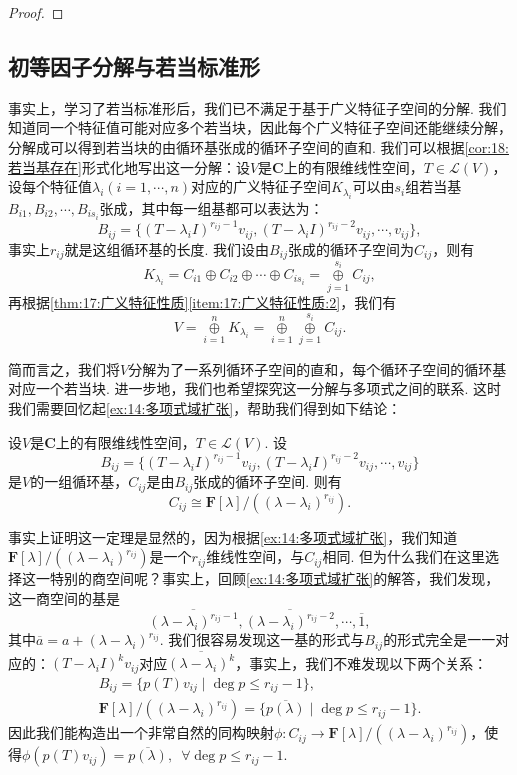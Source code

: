 \begin{proof}

\end{proof}

\subsection{初等因子分解与若当标准形}
事实上，学习了若当标准形后，我们已不满足于基于广义特征子空间的分解. 我们知道同一个特征值可能对应多个若当块，因此每个广义特征子空间还能继续分解，分解成可以得到若当块的由循环基张成的循环子空间的直和. 我们可以根据\autoref{cor:18:若当基存在}形式化地写出这一分解：设$V$是$\mathbf{C}$上的有限维线性空间，$T\in\mathcal{L}(V)$，设每个特征值$\lambda_i(i=1,\cdots,n)$对应的广义特征子空间$K_{\lambda_i}$可以由$s_i$组若当基$B_{i1},B_{i2},\cdots,B_{is_i}$张成，其中每一组基都可以表达为：
\[B_{ij}=\{(T-\lambda_iI)^{r_{ij}-1}v_{ij},(T-\lambda_iI)^{r_{ij}-2}v_{ij},\cdots,v_{ij}\},\]
事实上$r_{ij}$就是这组循环基的长度. 我们设由$B_{ij}$张成的循环子空间为$C_{ij}$，则有
\[K_{\lambda_i}=C_{i1}\oplus C_{i2}\oplus\cdots\oplus C_{is_i}=\mathop{\oplus}\limits_{j=1}^{s_i} C_{ij},\]
再根据\autoref{thm:17:广义特征性质}\ref{item:17:广义特征性质:2}，我们有
\begin{equation} \label{eq:19:循环子空间分解}
    V=\mathop{\oplus}\limits_{i=1}^n K_{\lambda_i}=\mathop{\oplus}\limits_{i=1}^n\mathop{\oplus}\limits_{j=1}^{s_i} C_{ij}.
\end{equation}

简而言之，我们将$V$分解为了一系列循环子空间的直和，每个循环子空间的循环基对应一个若当块. 进一步地，我们也希望探究这一分解与多项式之间的联系. 这时我们需要回忆起\autoref{ex:14:多项式域扩张}，帮助我们得到如下结论：
\begin{theorem} \label{thm:19:循环子空间同构于商空间}
    设$V$是$\mathbf{C}$上的有限维线性空间，$T\in\mathcal{L}(V)$. 设
    \[B_{ij}=\{(T-\lambda_iI)^{r_{ij}-1}v_{ij},(T-\lambda_iI)^{r_{ij}-2}v_{ij},\cdots,v_{ij}\}\]
    是$V$的一组循环基，$C_{ij}$是由$B_{ij}$张成的循环子空间. 则有
    \[C_{ij}\cong \mathbf{F}[\lambda]/((\lambda-\lambda_i)^{r_{ij}}).\]
\end{theorem}

事实上证明这一定理是显然的，因为根据\autoref{ex:14:多项式域扩张}，我们知道$\mathbf{F}[\lambda]/((\lambda-\lambda_i)^{r_{ij}})$是一个$r_{ij}$维线性空间，与$C_{ij}$相同. 但为什么我们在这里选择这一特别的商空间呢？事实上，回顾\autoref{ex:14:多项式域扩张}的解答，我们发现，这一商空间的基是
\[\overline{(\lambda-\lambda_i)^{r_{ij}-1}},\overline{(\lambda-\lambda_i)^{r_{ij}-2}},\cdots,\overline{1},\]
其中$\overline{a}=a+(\lambda-\lambda_i)^{r_{ij}}$. 我们很容易发现这一基的形式与$B_{ij}$的形式完全是一一对应的：$(T-\lambda_iI)^kv_{ij}$对应$\overline{(\lambda-\lambda_i)^k}$，事实上，我们不难发现以下两个关系：
\begin{gather*}
    B_{ij}=\{p(T)v_{ij}\mid \deg p\leqslant r_{ij}-1\},\\
    \mathbf{F}[\lambda]/((\lambda-\lambda_i)^{r_{ij}})=\{\overline{p(\lambda)}\mid \deg p\leqslant r_{ij}-1\}.
\end{gather*}
因此我们能构造出一个非常自然的同构映射$\phi:C_{ij}\to \mathbf{F}[\lambda]/((\lambda-\lambda_i)^{r_{ij}})$，使得$\phi(p(T)v_{ij})=\overline{p(\lambda)},\enspace\forall \deg p\leqslant r_{ij}-1$.

